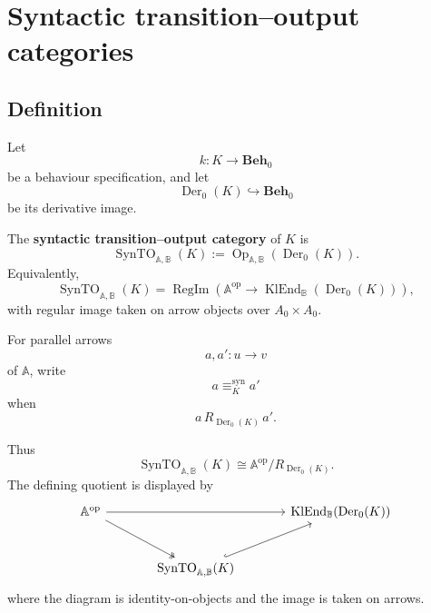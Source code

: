 \section{Syntactic transition--output categories}
\label{sec:syntactic-transition-output-categories}

\subsection{Definition}
\label{subsec:to-syntactic-categories-definition}

Let
\[
    k:K\to\mathbf{Beh}_0
\]
be a behaviour specification, and let
\[
    \operatorname{Der}_0(K)\hookrightarrow\mathbf{Beh}_0
\]
be its derivative image.

\begin{definition}
\label{def:to-syntactic-transition-output-category}
    The \textbf{syntactic transition--output category} of \(K\) is
    \[
        \operatorname{SynTO}_{\mathbb A,\mathbb B}(K)
        :=
        \operatorname{Op}_{\mathbb A,\mathbb B}(\operatorname{Der}_0(K)).
    \]
    Equivalently,
    \[
        \operatorname{SynTO}_{\mathbb A,\mathbb B}(K)
        =
        \operatorname{RegIm}
        \left(
            \mathbb A^{\mathrm{op}}
            \to
            \operatorname{KlEnd}_{\mathbb B}(\operatorname{Der}_0(K))
        \right),
    \]
    with regular image taken on arrow objects over \(A_0\times A_0\).
\end{definition}

\begin{definition}
\label{def:to-syntactic-operation-congruence}
    For parallel arrows
    \[
        a,a':u\to v
    \]
    of \(\mathbb A\), write
    \[
        a\equiv^{\mathrm{syn}}_K a'
    \]
    when
    \[
        a\,R_{\operatorname{Der}_0(K)}\,a'.
    \]
\end{definition}

Thus
\[
    \operatorname{SynTO}_{\mathbb A,\mathbb B}(K)
    \cong
    \mathbb A^{\mathrm{op}}/
    R_{\operatorname{Der}_0(K)}.
\]
The defining quotient is displayed by
\[
\begin{tikzcd}[column sep=large, row sep=large]
    \mathbb A^{\mathrm{op}}
        \arrow[rr]
        \arrow[dr, two heads]
    &&
    \operatorname{KlEnd}_{\mathbb B}(\operatorname{Der}_0(K))
    \\
    &
    \operatorname{SynTO}_{\mathbb A,\mathbb B}(K)
        \arrow[ur, hook]
    &
\end{tikzcd}
\]
where the diagram is identity-on-objects and the image is taken on arrows.

